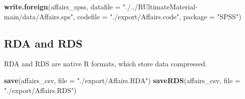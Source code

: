 \documentclass[
]{article}
\newenvironment{Shaded}{\begin{snugshade}}{\end{snugshade}}
\newcommand{\AttributeTok}[1]{\textcolor[rgb]{0.13,0.29,0.53}{#1}}
\newcommand{\FunctionTok}[1]{\textcolor[rgb]{0.13,0.29,0.53}{\textbf{#1}}}
\newcommand{\NormalTok}[1]{#1}
\newcommand{\StringTok}[1]{\textcolor[rgb]{0.31,0.60,0.02}{#1}}
\begin{document}
\begin{Shaded}
\begin{Highlighting}[]
\FunctionTok{write.foreign}\NormalTok{(affairs\_spss, }\AttributeTok{datafile =} \StringTok{"./../RUltimateMaterial{-}main/data/Affairs.sps"}\NormalTok{, }\AttributeTok{codefile =} \StringTok{"./export/Affairs.code"}\NormalTok{, }\AttributeTok{package =} \StringTok{"SPSS"}\NormalTok{)}
\end{Highlighting}
\end{Shaded}

\subsection{RDA and RDS}\label{rda-and-rds}

RDA and RDS are native R formats, which store data compressed.

\begin{Shaded}
\begin{Highlighting}[]
\FunctionTok{save}\NormalTok{(affairs\_csv, }\AttributeTok{file =} \StringTok{"./export/Affairs.RDA"}\NormalTok{)}
\FunctionTok{saveRDS}\NormalTok{(affairs\_csv, }\AttributeTok{file =} \StringTok{"./export/Affairs.RDS"}\NormalTok{)}
\end{Highlighting}
\end{Shaded}
\end{document}
